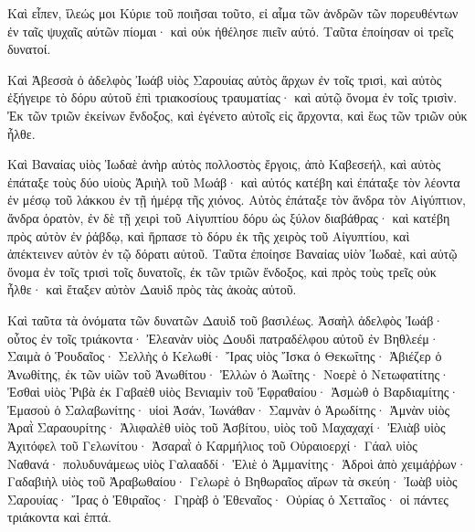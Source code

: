 {Καὶ εἶπεν, ἵλεώς μοι Κύριε τοῦ ποιῆσαι τοῦτο, εἰ αἷμα τῶν ἀνδρῶν τῶν πορευθέντων ἐν ταῖς ψυχαῖς αὐτῶν πίομαι· καὶ οὐκ ἠθέλησε πιεῖν αὐτό. Ταῦτα ἐποίησαν οἱ τρεῖς δυνατοί.
\par }{\PP {}Καὶ Ἀβεσσὰ ὁ ἀδελφὸς Ἰωάβ υἱὸς Σαρουίας αὐτὸς ἄρχων ἐν τοῖς τρισὶ, καὶ αὐτὸς ἐξήγειρε τὸ δόρυ αὐτοῦ ἐπὶ τριακοσίους τραυματίας· καὶ αὐτῷ ὄνομα ἐν τοῖς τρισὶν.
Ἐκ τῶν τριῶν ἐκείνων ἔνδοξος, καὶ ἐγένετο αὐτοῖς εἰς ἄρχοντα, καὶ ἕως τῶν τριῶν οὐκ ἦλθε.
\par }{\PP {}Καὶ Βαναίας υἱὸς Ἰωδαὲ ἀνὴρ αὐτὸς πολλοστὸς ἔργοις, ἀπὸ Καβεσεήλ, καὶ αὐτὸς ἐπάταξε τοὺς δύο υἱοὺς Ἀριὴλ τοῦ Μωάβ· καὶ αὐτός κατέβη καὶ ἐπάταξε τὸν λέοντα ἐν μέσῳ τοῦ λάκκου ἐν τῇ ἡμέρᾳ τῆς χιόνος.
Αὐτὸς ἐπάταξε τὸν ἄνδρα τὸν Αἰγύπτιον, ἄνδρα ὁρατὸν, ἐν δὲ τῇ χειρὶ τοῦ Αἰγυπτίου δόρυ ὡς ξύλον διαβάθρας· καὶ κατέβη πρὸς αὐτὸν ἐν ῥἀβδῳ, καὶ ἥρπασε τὸ δόρυ ἐκ τῆς χειρὸς τοῦ Αἰγυπτίου, καὶ ἀπέκτεινεν αὐτὸν ἐν τῷ δόρατι αὐτοῦ.
Ταῦτα ἐποίησε Βαναίας υἱὸν Ἰωδαὲ, καὶ αὐτῷ ὄνομα ἐν τοῖς τρισὶ τοῖς δυνατοῖς,
ἐκ τῶν τριῶν ἔνδοξος, καὶ πρὸς τοὺς τρεῖς οὐκ ἦλθε· καὶ ἔταξεν αὐτὸν Δαυὶδ πρὸς τὰς ἀκοὰς αὐτοῦ.
\par }{\PP Καὶ ταῦτα τὰ ὀνόματα τῶν δυνατῶν Δαυὶδ τοῦ βασιλέως.
Ἀσαὴλ ἀδελφὸς Ἰωάβ· οὗτος ἐν τοῖς τριάκοντα· Ἐλεανὰν υἱὸς Δουδὶ πατραδέλφου αὐτοῦ ἐν Βηθλεέμ·
Σαιμὰ ὁ Ῥουδαῖος·
Σελλὴς ὁ Κελωθί· Ἴρας υἱὸς Ἴσκα ὁ Θεκωΐτης·
Ἀβιέζερ ὁ Ἀνωθίτης, ἐκ τῶν υἱῶν τοῦ Ἀνωθίτου·
Ἐλλὼν ὁ Ἀωΐτης· Νοερὲ ὁ Νετωφατίτης·
Ἐσθαὶ υἱὸς Ῥιβὰ ἐκ Γαβαὲθ υἱὸς Βενιαμὶν τοῦ Ἐφραθαίου· Ἀσμὼθ ὁ Βαρδιαμίτης·
Ἐμασοὺ ὁ Σαλαβωνίτης· υἱοὶ Ἀσάν, Ἰωνάθαν·
Σαμνὰν ὁ Ἁρωδίτης· Ἀμνὰν υἱὸς Ἀραῒ Σαραουρίτης·
Ἀλιφαλὲθ υἱὸς τοῦ Ἀσβίτου, υἱὸς τοῦ Μαχαχαχί· Ἐλιὰβ υἱὸς Ἀχιτόφελ τοῦ Γελωνίτου·
Ἀσαραῒ ὁ Καρμήλιος τοῦ Οὐραιοερχί·
Γάαλ υἱὸς Ναθανά· πολυδυνάμεως υἱὸς Γαλααδδί·
Ἐλιὲ ὁ Ἀμμανίτης·
Ἁδροὶ ἀπὸ χειμάῤῥων·
Γαδαβιὴλ υἱὸς τοῦ Ἀραβωθαίου·
Γελωρὲ ὁ Βηθωραῖος αἴρων τὰ σκεύη· Ἰωὰβ υἱὸς Σαρουίας·
Ἴρας ὁ Ἐθιραῖος· Γηρὰβ ὁ Ἐθεναῖος·
Οὐρίας ὁ Χετταῖος· οἱ πάντες τριάκοντα καὶ ἑπτά.

}
